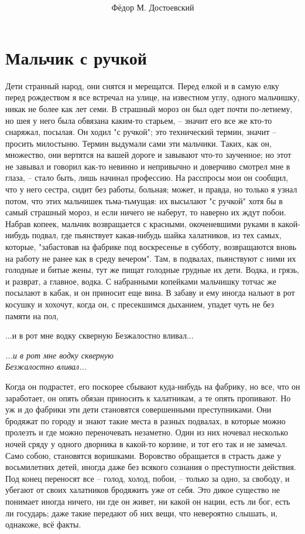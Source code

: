\documentclass[a4paper, 12pt]{article}
\title{
	\Huge{\MyTitle}
}
\author{Фёдор М. Достоевский}
\date{}
\begin{document}
	\maketitle

    \section{Мальчик  с ручкой}
    
    Дети странный народ, они снятся и мерещатся. Перед елкой и в самую елку перед рождеством я все встречал на улице, на известном углу, одного мальчишку, никак не более как лет семи. В страшный мороз он был одет почти по-летнему, но шея у него была обвязана каким-то старьем, -- значит его все же кто-то снаряжал, посылая. Он ходил "с ручкой"; это технический термин, значит -- просить милостыню. Термин выдумали сами эти мальчики. Таких, как он, множество, они вертятся на вашей дороге и завывают что-то заученное; но этот не завывал и говорил как-то невинно и непривычно и доверчиво смотрел мне в глаза, -- стало быть, лишь начинал профессию. На расспросы мои он сообщил, что у него сестра, сидит без работы, больная; может, и правда, но только я узнал потом, что этих мальчишек тьма-тьмущая: их высылают "с ручкой" хотя бы в самый страшный мороз, и если ничего не наберут, то наверно их ждут побои. Набрав копеек, мальчик возвращается с красными, окоченевшими руками в какой-нибудь подвал, где пьянствует какая-нибудь шайка халатников, из тех самых, которые, "забастовав на фабрике под воскресенье в субботу, возвращаются вновь на работу не ранее как в среду вечером". Там, в подвалах, пьянствуют с ними их голодные и битые жены, тут же пищат голодные грудные их дети. Водка, и грязь, и разврат, а главное, водка. С набранными копейками мальчишку тотчас же посылают в кабак, и он приносит еще вина. В забаву и ему иногда нальют в рот косушку и хохочут, когда он, с пресекшимся дыханием, упадет чуть не без памяти на пол, 
    
    ...и в рот мне водку скверную 
    Безжалостно вливал... 

    \begin{center}\textit{
		...и в рот мне водку скверную \\
		Безжалостно вливал... }
	\end{center}
    
    Когда он подрастет, его поскорее сбывают куда-нибудь на фабрику, но все, что он заработает, он опять обязан приносить к халатникам, а те опять пропивают. Но уж и до фабрики эти дети становятся совершенными преступниками. Они бродяжат по городу и знают такие места в разных подвалах, в которые можно пролезть и где можно переночевать незаметно. Один из них ночевал несколько ночей сряду у одного дворника в какой-то корзине, и тот его так и не замечал. Само собою, становятся воришками. Воровство обращается в страсть даже у восьмилетних детей, иногда даже без всякого сознания о преступности действия. Под конец переносят все -- голод, холод, побои, -- только за одно, за свободу, и убегают от своих халатников бродяжить уже от себя. Это дикое существо не понимает иногда ничего, ни где он живет, ни какой он нации, есть ли бог, есть ли государь; даже такие передают об них вещи, что невероятно слышать, и, однакоже, всё факты. 
    
\end{document}

